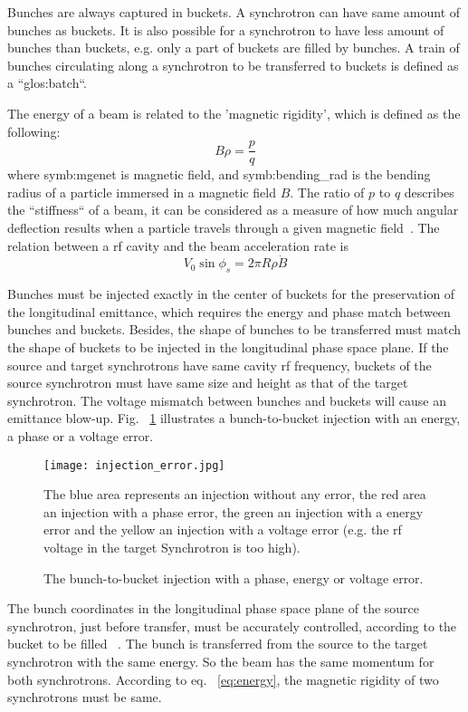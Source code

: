 Bunches are always captured in buckets. A synchrotron can have same amount of bunches as buckets. It is also possible for a synchrotron to have less amount of bunches than buckets, e.g. only a part of buckets are filled by bunches. A train of bunches circulating along a synchrotron to be transferred to buckets is defined as a ``\gls{glos:batch}``.

The energy of a beam is related to the 'magnetic rigidity', which is defined as the following:
\begin{equation}
	\label{eq:energy}
	B\rho =\frac{p}{q}
\end{equation}
where \gls{symb:mgenet} is magnetic field, and \gls{symb:bending_rad} is the bending radius of a particle immersed in a magnetic field $B$. The ratio of $p$ to $q$ describes the ``stiffness`` of a beam, it can be considered as a measure of how much angular deflection results when a particle travels through a given magnetic field~\cite{barletta_overview_????}. The relation between a rf cavity and the beam acceleration rate is
\begin{equation}
	\label{eq:rf_acceleration}
	V_0\sin\phi_s=2\pi R\rho\dot{B}
\end{equation}

Bunches must be injected exactly in the center of buckets for the preservation of the longitudinal emittance, which requires the energy and phase match between bunches and buckets. Besides, the shape of bunches to be transferred must match the shape of buckets to be injected in the longitudinal phase space plane. If the source and target synchrotrons have same cavity rf frequency, buckets of the source synchrotron must have same size and height as that of the target synchrotron. The voltage mismatch between bunches and buckets will cause an emittance blow-up. Fig. ~\ref{injection_error} illustrates a bunch-to-bucket injection with an energy, a phase or a voltage error. 
\begin{figure}[!htb]
   \centering   
   \texttt{[image: injection\_error.jpg]}
   \caption{The bunch-to-bucket injection with a phase, energy or voltage error.}{The blue area represents an injection without any error, the red area an injection with a phase error, the green an injection with a energy error and the yellow an injection with a voltage error (e.g. the rf voltage in the target Synchrotron is too high).}
   \label{injection_error}
\end{figure} 

The bunch coordinates in the longitudinal phase space plane of the source synchrotron, just before transfer, must be accurately controlled, according to the bucket to be filled ~\cite{garoby_timing_1984}. The bunch is transferred from the source to the target synchrotron with the same energy. So the beam has the same momentum for both synchrotrons. According to eq. ~\ref{eq:energy}, the magnetic rigidity of two synchrotrons must be same.

